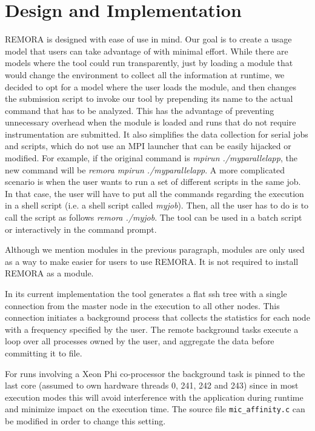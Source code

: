 \documentclass[10pt,a4paper]{report}
\begin{document}
\chapter{Design and Implementation}
REMORA is designed with ease of use in mind. Our goal is to create a usage model that users can take advantage of with minimal effort. While there are models where the tool could run transparently, just by loading a module that would change the environment to collect all the information at runtime, we decided to opt for a model where the user loads the module, and then changes the submission script to invoke our tool by prepending its name to the actual command that has to be analyzed. This has the advantage of preventing unnecessary overhead when the module is loaded and runs that do not require instrumentation are submitted. It also simplifies the data collection for serial jobs and scripts, which do not use an MPI launcher that can be easily hijacked or modified. For example, if the original command is \textit{mpirun ./myparallelapp}, the new command will be \textit{remora mpirun ./myparallelapp}. A more complicated scenario is when the user wants to run a set of different scripts in the same job. In that case, the user will have to put all the commands regarding the execution in a shell script (i.e. a shell script called \textit{myjob}). Then, all the user has to do is to call the script as follows \textit{remora ./myjob}. The tool can be used in a batch script or interactively in the command prompt.

Although we mention modules in the previous paragraph, modules are only used as a way to make easier for users to use REMORA. It is not required to install REMORA as a module.

In its current implementation the tool generates a flat ssh tree with a single connection from the master node in the execution to all other nodes. This connection initiates a background process that collects the statistics for each node with a frequency specified by the user. The remote background tasks execute a loop over all processes owned by the user, and aggregate the data before committing it to file.

For runs involving a Xeon Phi co-processor the background task is pinned to the last core (assumed to own hardware threads 0, 241, 242 and 243) since in most execution modes this will avoid interference with the application during runtime and minimize impact on the execution time. The source file \texttt{mic\_affinity.c} can be modified in order to change this setting.
\end{document}
